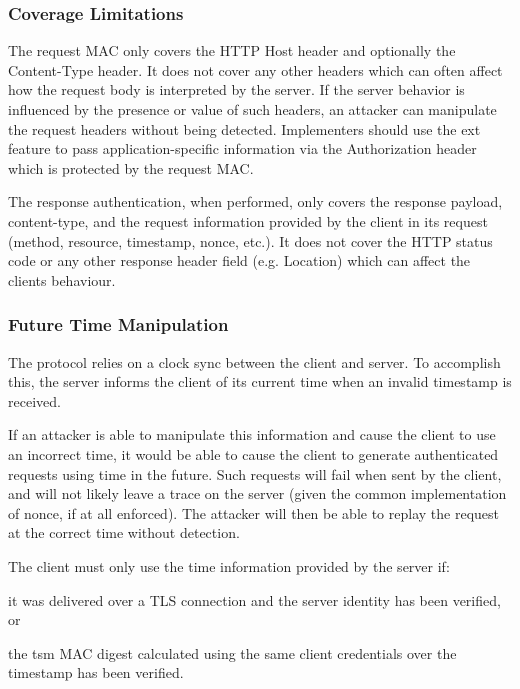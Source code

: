 \subsubsection*{Coverage Limitations}

The request M\+A\+C only covers the H\+T\+T\+P {\ttfamily Host} header and optionally the {\ttfamily Content-\/\+Type} header. It does not cover any other headers which can often affect how the request body is interpreted by the server. If the server behavior is influenced by the presence or value of such headers, an attacker can manipulate the request headers without being detected. Implementers should use the {\ttfamily ext} feature to pass application-\/specific information via the {\ttfamily Authorization} header which is protected by the request M\+A\+C.

The response authentication, when performed, only covers the response payload, content-\/type, and the request information provided by the client in it\textquotesingle{}s request (method, resource, timestamp, nonce, etc.). It does not cover the H\+T\+T\+P status code or any other response header field (e.\+g. Location) which can affect the client\textquotesingle{}s behaviour.

\subsubsection*{Future Time Manipulation}

The protocol relies on a clock sync between the client and server. To accomplish this, the server informs the client of its current time when an invalid timestamp is received.

If an attacker is able to manipulate this information and cause the client to use an incorrect time, it would be able to cause the client to generate authenticated requests using time in the future. Such requests will fail when sent by the client, and will not likely leave a trace on the server (given the common implementation of nonce, if at all enforced). The attacker will then be able to replay the request at the correct time without detection.

The client must only use the time information provided by the server if\+:
\begin{DoxyItemize}
\item it was delivered over a T\+L\+S connection and the server identity has been verified, or
\item the {\ttfamily tsm} M\+A\+C digest calculated using the same client credentials over the timestamp has been verified.
\end{DoxyItemize}

